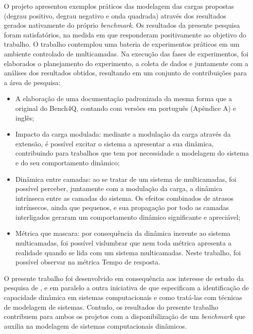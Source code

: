 O projeto apresentou exemplos práticos das modelagem das cargas propostas (degrau positivo, degrau negativo e onda quadrada) através dos resultados gerados nativamente do próprio \textit{benchmark}. Os resultados da presente pesquisa foram satisfatórios, na medida em que responderam positivamente ao objetivo do trabalho. O trabalho contemplou uma bateria de experimentos práticos em um ambiente controlado de multicamadas. Na execução das fases de experimentos, foi elaborados o planejamento do experimento, a coleta de dados e juntamente com a análises dos resultados obtidos, resultando em um conjunto de contribuições para a área de pesquisa:
\begin{itemize}
	\item A elaboração de uma documentação padronizada da mesma forma que a original do Bench4Q, contando com versões em português (Apêndice A) e inglês;
	
	\item Impacto da carga modulada: mediante a modulação da carga através da extensão, é possível excitar o sistema a apresentar a sua dinâmica, contribuindo para trabalhos que tem por necessidade a modelagem do sistema e do seu comportamento dinâmico;
	
	\item Dinâmica entre camadas: ao se tratar de um sistema de multicamadas, foi possível perceber, juntamente com a modulação da carga, a dinâmica intrínseca entre as camadas do sistema. Os efeitos combinados de atrasos intrínsecos, ainda que pequenos, e sua propagação por todo as camadas interligados geraram um comportamento dinâmico significante e apreciável;
	
	\item Métrica que mascara: por consequência da dinâmica inerente ao sistema multicamadas, foi possível vislumbrar que nem toda métrica apresenta a realidade quando se lida com um sistema multicamadas. Neste trabalho, foi possível observar na métrica Tempo de resposta.
\end{itemize} 

O presente trabalho foi desenvolvido em consequência aos interesse de estudo da pesquisa de , e em paralelo a outra iniciativa de  que especificam a identificação de capacidade dinâmica em sistemas computacionais e como tratá-las com técnicas de modelagem de sistemas. Contudo, os resultados do presente trabalho contribuem para ambos os projetos com a disponibilização de um \textit{benchmark} que auxilia na modelagem de sistemas computacionais dinâmicos.

